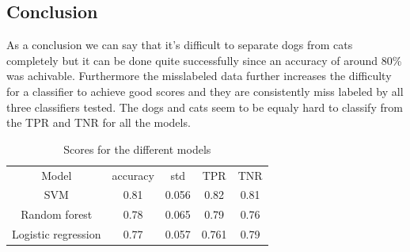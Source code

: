 \documentclass{article}
\begin{document}
\subsection{Conclusion}
As a conclusion we can say that it's difficult to separate dogs from cats completely but it can be done quite successfully since an accuracy of around 80\% was achivable. Furthermore the misslabeled data further increases the difficulty for a classifier to achieve good scores and they are consistently miss labeled by all three classifiers tested. The dogs and cats seem to be equaly hard to classify from the TPR and TNR for all the models.  
\begin{table}[H]
    \centering
    \begin{tabular}{c|c|c|c|c}
        Model & accuracy & std & TPR & TNR \\
         SVM & 0.81 & 0.056 & 0.82 & 0.81 \\
         Random forest & 0.78 & 0.065 & 0.79 & 0.76 \\
         Logistic regression & 0.77 & 0.057 & 0.761 & 0.79
    \end{tabular}
    \caption{Scores for the different models}
    \label{score}
\end{table}
\end{document}
